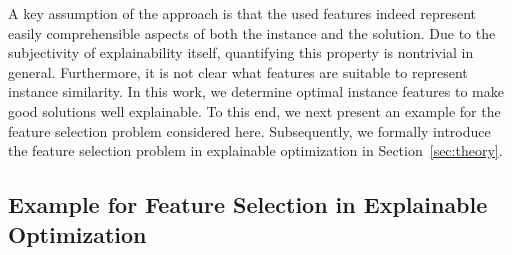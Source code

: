 \documentclass[11pt, a4paper]{article}
\begin{document}
A key assumption of the approach is that the used
features indeed represent easily comprehensible aspects of both the
instance and the solution.
Due to the subjectivity of explainability
itself, quantifying this property is nontrivial in general. 
Furthermore, it is not clear what features are suitable to represent instance similarity. 
In this work, we determine optimal instance features to make good
solutions well explainable. To this end, we next present an example for the feature selection problem considered here. Subsequently, we formally introduce the feature selection problem in explainable optimization in Section~\ref{sec:theory}.

\subsection{Example for Feature Selection in Explainable Optimization}



\end{document}
